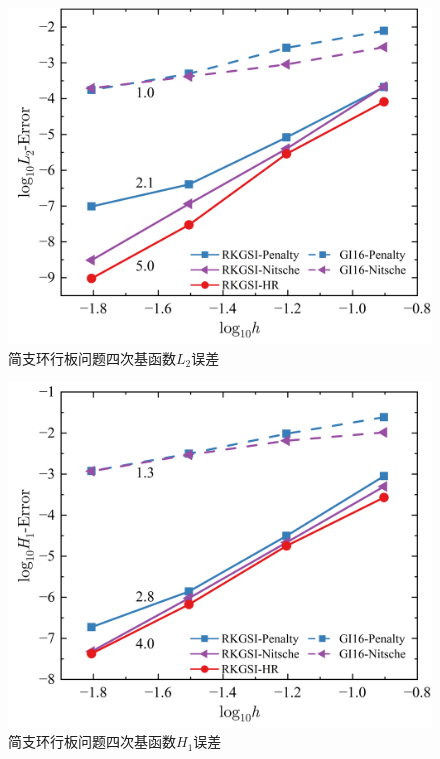 \begin{figure}[H]
    \centering
    \includegraphics[scale=0.5]{figure/PHR/A/QL2.png}
    \caption{简支环行板问题四次基函数$L_2$误差}\label{AQLH1}
\end{figure}
\newpage
\begin{figure}[H]
    \centering
    \includegraphics[scale=0.5]{figure/PHR/A/QH1.png}
    \caption{简支环行板问题四次基函数$H_1$误差}
\end{figure}
